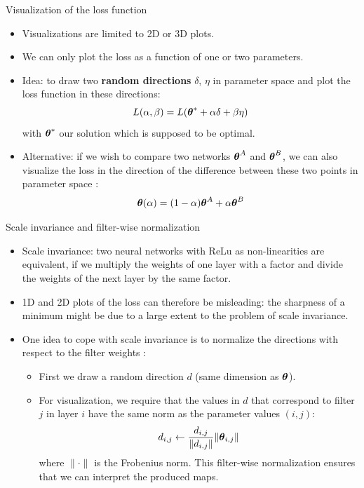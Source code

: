 \documentclass[xcolor=pdftex,dvipsnames,table]{beamer}
\begin{document}
\begin{frame}{Visualization of the loss function}
\begin{itemize}
	\item Visualizations are limited to 2D or 3D plots.
	\item We can only plot the loss as a function of one or two parameters. 
	\item Idea: to draw two {\bf random directions} $\delta$, $\eta$ in parameter space and plot the loss function in these directions:
	\begin{equation}
	L (\alpha, \beta) = L(\boldsymbol{\theta}^{\ast} + \alpha \delta + \beta \eta) 
	\end{equation}
	with $\boldsymbol{\theta}^{\ast}$ our solution which is supposed to be optimal. 
	\item Alternative: if we wish to compare two networks $\boldsymbol{\theta}^A$ and $\boldsymbol{\theta}^B$, we can also visualize the loss in the direction of the difference between these two points in parameter space \cite{Goodfellow:2015}:
	\begin{equation}
		\boldsymbol{\theta}(\alpha) = (1 - \alpha)\boldsymbol{\theta}^A + \alpha \boldsymbol{\theta}^B
	\end{equation}
\end{itemize}
\end{frame}


\begin{frame}{Scale invariance and filter-wise normalization}
\begin{itemize}
	\item Scale invariance: two neural networks with ReLu as non-linearities are equivalent, if we multiply the weights of one layer with a factor and divide the weights of the next layer by the same factor. 
	\item 1D and 2D plots of the loss can therefore be misleading: the sharpness of a minimum might be due to a large extent to the problem of scale invariance. 
	\item One idea to cope with scale invariance is to normalize the directions with respect to the filter weights \cite{Li:2018}:
	\begin{itemize}
		\item First we draw a random direction $d$ (same dimension as $\boldsymbol{\theta}$). 
		\item For visualization, we require that the values in $d$ that correspond to filter $j$ in layer $i$ have the same norm as the parameter values $(i,j)$:
		\begin{equation}
			d_{i,j} \leftarrow \frac{d_{i,j}}{\|d_{i,j}\|}\|\boldsymbol{\theta}_{i,j}\|
		\end{equation}
		where $\|\cdot\|$ is the Frobenius norm. This filter-wise normalization ensures that we can interpret the produced maps.
	\end{itemize}
\end{itemize}
\end{frame}
\end{document}
